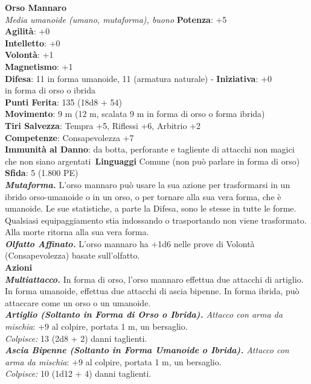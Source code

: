 \begin{multicols}{2}
\medskip\textbf{Orso Mannaro}\\
\emph{Media umanoide (umano, mutaforma), buono}
\textbf{Potenza}: +5\\
\textbf{Agilità}: +0\\
\textbf{Intelletto}: +0\\
\textbf{Volontà}: +1\\
\textbf{Magnetismo}: +1\\
\textbf{Difesa}: 11 in forma umanoide, 11 (armatura naturale) - \textbf{Iniziativa}: +0\\
in forma di orso o ibrida\\
\textbf{Punti Ferita}: 135 (18d8 + 54)\\
\textbf{Movimento}: 9 m (12 m, scalata 9 m in forma di orso o forma ibrida) \\
\textbf{Tiri Salvezza}:  Tempra +5, Riflessi +6, Arbitrio +2\\
\textbf{Competenze}: Consapevolezza +7\\
\textbf{Immunità al Danno}: da botta, perforante e tagliente di attacchi non magici che non siano argentati\
\textbf{Linguaggi} Comune (non può parlare in forma di orso)\\
\textbf{Sfida}: 5 (1.800 PE)\smallskip\\
\emph{\textbf{Mutaforma.}} L'orso mannaro può usare la sua azione per trasformarsi in un ibrido orso-umanoide o in un orso, o per tornare alla sua vera forma, che è umanoide. Le sue statistiche, a parte la Difesa, sono le stesse in tutte le forme. Qualsiasi equipaggiamento stia indossando o trasportando non viene trasformato. Alla morte ritorna alla sua vera forma.\\
\emph{\textbf{Olfatto Affinato.}} L'orso mannaro ha +1d6 nelle prove di Volontà (Consapevolezza) basate sull'olfatto.\\
\smallskip\textbf{Azioni}\\
\emph{\textbf{Multiattacco.}} In forma di orso, l'orso mannaro effettua due attacchi di artiglio. In forma umanoide, effettua due attacchi di ascia bipenne. In forma ibrida, può attaccare come un orso o un umanoide.\\

\emph{\textbf{Artiglio (Soltanto in Forma di Orso o Ibrida).} Attacco con arma da mischia}: +9 al colpire, portata 1 m, un bersaglio.\\
\emph{Colpisce:} 13 (2d8 + 2) danni taglienti.\\

\emph{\textbf{Ascia Bipenne (Soltanto in Forma Umanoide o Ibrida).} Attacco con arma da mischia}: +9 al colpire, portata 1 m, un bersaglio.\\
\emph{Colpisce:} 10 (1d12 + 4) danni taglienti.\\


\end{multicols}
